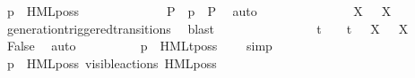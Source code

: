 \begin{isabellebody}
\ {\isacartoucheopen}{\isasymtheta}{\isacharparenleft}{\kern0pt}p{\isacharparenright}{\kern0pt}\ {\isasymTurnstile}\ HML{\isacharunderscore}{\kern0pt}poss\ {\isasymalpha}\ {\isasymsigma}{\isacharparenleft}{\kern0pt}{\isasymphi}{\isacharparenright}{\kern0pt}{\isacartoucheclose}\isanewline
\ \ \ \ \ \ \ \ \isamarkupfalse%
\ \isamarkupfalse%
\ P{\isacharprime}{\kern0pt}\ \ {\isacartoucheopen}{\isasymtheta}{\isacharparenleft}{\kern0pt}p{\isacharparenright}{\kern0pt}\ {\isasymlongmapsto}\isactrlsup {\isasymtheta}{\isasymalpha}\ P{\isacharprime}{\kern0pt}{\isacartoucheclose}\ \isamarkupfalse%
\ auto\isanewline
\ \ \ \ \ \ \ \ \isamarkupfalse%
\ {\isacartoucheopen}{\isasymalpha}\ {\isacharequal}{\kern0pt}\ {\isasymtau}\ {\isasymor}\ {\isacharparenleft}{\kern0pt}{\isasymexists}\ X{\isachardot}{\kern0pt}\ {\isasymalpha}\ {\isacharequal}{\kern0pt}\ {\isasymepsilon}{\isacharbrackleft}{\kern0pt}X{\isacharbrackright}{\kern0pt}{\isacharparenright}{\kern0pt}{\isacartoucheclose}\ \isamarkupfalse%
\ generation{\isacharunderscore}{\kern0pt}triggered{\isacharunderscore}{\kern0pt}transitions\ \isamarkupfalse%
\ blast\isanewline
\ \ \ \ \ \ \ \ \isamarkupfalse%
\ {\isacartoucheopen}{\isasymalpha}\ {\isasymnoteq}\ {\isasymtau}\ {\isasymand}\ {\isasymalpha}\ {\isasymnoteq}\ t\ {\isasymand}\ {\isasymalpha}\ {\isasymnoteq}\ t{\isacharunderscore}{\kern0pt}{\isasymepsilon}\ {\isasymand}\ {\isacharparenleft}{\kern0pt}{\isasymforall}\ X{\isachardot}{\kern0pt}\ {\isasymalpha}\ {\isasymnoteq}\ {\isasymepsilon}{\isacharbrackleft}{\kern0pt}X{\isacharbrackright}{\kern0pt}{\isacharparenright}{\kern0pt}{\isacartoucheclose}\ \isamarkupfalse%
\ False\ \isamarkupfalse%
\ auto\isanewline
\ \ \ \ \ \ \ \ \isamarkupfalse%
\ {\isacartoucheopen}p\ {\isasymTTurnstile}\ HMLt{\isacharunderscore}{\kern0pt}poss\ {\isasymalpha}\ {\isasymphi}{\isacartoucheclose}\ \isamarkupfalse%
\ simp\isanewline
\ \ \ \ \ \ \isamarkupfalse%
\isanewline
\ \ \ \ \ \ \ \ \isamarkupfalse%
\ {\isacartoucheopen}{\isasymtheta}{\isacharparenleft}{\kern0pt}p{\isacharparenright}{\kern0pt}\ {\isasymTurnstile}\ HML{\isacharunderscore}{\kern0pt}poss\ {\isacharparenleft}{\kern0pt}{\isasymepsilon}{\isacharbrackleft}{\kern0pt}visible{\isacharunderscore}{\kern0pt}actions{\isacharbrackright}{\kern0pt}{\isacharparenright}{\kern0pt}\ {\isacharparenleft}{\kern0pt}HML{\isacharunderscore}{\kern0pt}poss\ {\isasymalpha}\ {\isasymsigma}{\isacharparenleft}{\kern0pt}{\isasymphi}{\isacharparenright}{\kern0pt}{\isacharparenright}{\kern0pt}{\isacartoucheclose}\isanewline

\end{isabellebody}
